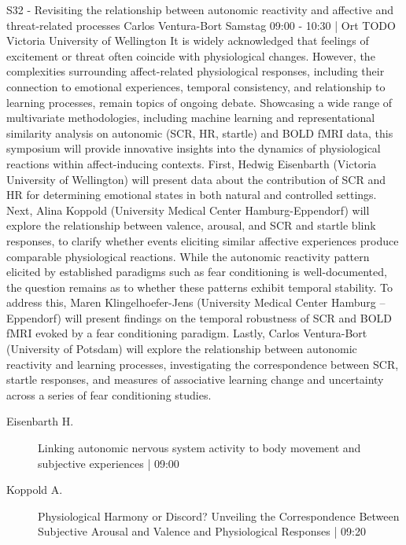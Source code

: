 
            \begin{symposium}
            {S32 - Revisiting the relationship between autonomic reactivity and affective and threat-related processes }
            {Carlos Ventura-Bort }
            {Samstag 09:00 - 10:30 | Ort TODO}
            {Victoria University of Wellington}
            It is widely acknowledged that feelings of excitement or threat often coincide with physiological changes. However, the complexities surrounding affect-related physiological responses, including their connection to emotional experiences, temporal consistency, and relationship to learning processes, remain topics of ongoing debate. Showcasing a wide range of multivariate methodologies, including machine learning and representational similarity analysis on autonomic (SCR, HR, startle) and BOLD fMRI data, this symposium will provide innovative insights into the dynamics of physiological reactions within affect-inducing contexts.
First, Hedwig Eisenbarth (Victoria University of Wellington) will present data about the contribution of SCR and HR for determining emotional states in both natural and controlled settings. Next, Alina Koppold (University Medical Center Hamburg-Eppendorf) will explore the relationship between valence, arousal, and SCR and startle blink responses, to clarify whether events eliciting similar affective experiences produce comparable physiological reactions. While the autonomic reactivity pattern elicited by established paradigms such as fear conditioning is well-documented, the question remains as to whether these patterns exhibit temporal stability. To address this, Maren Klingelhoefer-Jens (University Medical Center Hamburg – Eppendorf) will present findings on the temporal robustness of SCR and BOLD fMRI evoked by a fear conditioning paradigm. Lastly, Carlos Ventura-Bort (University of Potsdam) will explore the relationship between autonomic reactivity and learning processes, investigating the correspondence between SCR, startle responses, and measures of associative learning change and uncertainty across a series of fear conditioning studies.
            \begin{description}    
            
                \item [ Eisenbarth H.] Linking autonomic nervous system activity to body movement and subjective experiences \textcolor{mygray}{ | 09:00}    
                
                \item [ Koppold A.] Physiological Harmony or Discord? Unveiling the Correspondence Between Subjective Arousal and Valence and Physiological Responses \textcolor{mygray}{ | 09:20}    
                

\end{description}
\end{symposium}
